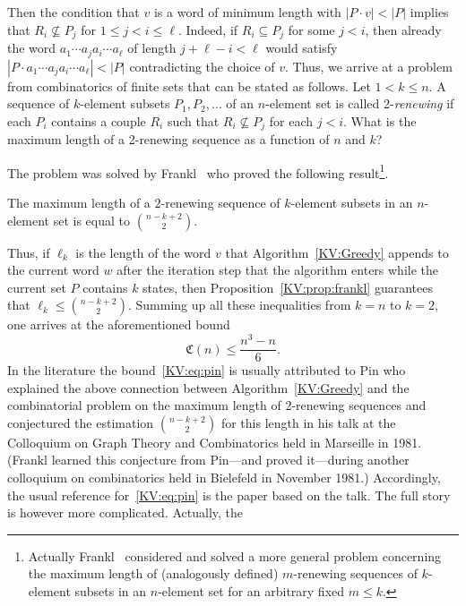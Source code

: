\documentclass{irmaart}
\theoremstyle{plain}
\begin{document}
\noindent Then the condition that $v$ is a word of minimum length with $|P\cdot
v|<|P|$ implies that $R_i\nsubseteq P_j$ for $1\le j<i\le\ell$. Indeed, if
$R_i\subseteq P_j$ for some $j<i$, then already the word $a_1\cdots
a_ja_i\cdots a_\ell$ of length $j+\ell-i<\ell$ would satisfy $|P\cdot a_1\cdots
a_ja_i\cdots a_\ell|<|P|$ contradicting the choice of $v$. Thus, we arrive at a
problem from combinatorics of finite sets that can be stated as follows. Let
$1<k\le n$. A sequence of $k$-element subsets $P_1,P_2,\dots$ of an $n$-element
set is called 2-\emph{renewing} if each $P_i$
contains a couple $R_i$ such that $R_i\nsubseteq P_j$ for each $j<i$. What is
the maximum length of a 2-renewing sequence as a function of $n$ and $k$?

The problem was solved by Frankl~\cite{Frankl:1982} who proved the following
result\footnote{Actually Frankl~\cite{Frankl:1982} considered and solved a more
general problem concerning the maximum length of (analogously defined)
$m$-renewing sequences of $k$-element subsets in an $n$-element set for an
arbitrary fixed $m\le k$.}.
\begin{proposition}
\label{KV:prop:frankl} The maximum length of a $2$-renewing sequence of
$k$-element subsets in an $n$-element set is equal to $\binom{n-k+2}2$.
\end{proposition}
Thus, if $\ell_k$ is the length of the word $v$ that Algorithm~\ref{KV:Greedy}
appends to the current word $w$ after the iteration step that the algorithm
enters while the current set $P$ contains $k$ states, then
Proposition~\ref{KV:prop:frankl} guarantees that $\ell_k\le\binom{n-k+2}2$.
Summing up all these inequalities from $k=n$ to $k=2$, one arrives at the
aforementioned bound
\begin{equation}
\label{KV:eq:pin} \mathfrak{C}(n)\le\dfrac{n^3-n}6.
\end{equation}
In the literature the bound~\eqref{KV:eq:pin} is usually attributed to Pin who
explained the above connection between Algorithm~\ref{KV:Greedy} and the
combinatorial problem on the maximum length of 2-renewing sequences and
conjectured the estimation $\binom{n-k+2}2$ for this length in his talk at the
Colloquium on Graph Theory and Combinatorics held in Marseille in 1981. (Frankl
learned this conjecture from Pin---and proved it---during another colloquium on
combinatorics held in Bielefeld in November 1981.) Accordingly, the usual
reference for~\eqref{KV:eq:pin} is the paper \cite{Pin:1983} based on the talk.
The full story is however more complicated. Actually, the
\end{document}
